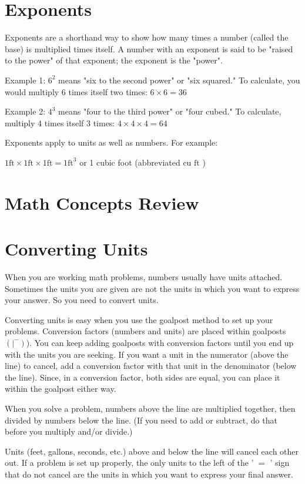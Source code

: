 \documentclass[10pt]{article}
\begin{document}
\section{Exponents}
Exponents are a shorthand way to show how many times a number (called the base) is multiplied times itself. A number with an exponent is said to be "raised to the power" of that exponent; the exponent is the "power".

Example 1: $6^{2}$ means "six to the second power" or "six squared." To calculate, you would multiply 6 times itself two times: $6 \times 6=36$

Example 2: $4^{3}$ means "four to the third power" or "four cubed." To calculate, multiply 4 times itself 3 times: $4 \times 4 \times 4=64$

Exponents apply to units as well as numbers. For example:

$1 \mathrm{ft} \times 1 \mathrm{ft} \times 1 \mathrm{ft}=1 \mathrm{ft}^{3}$ or 1 cubic foot (abbreviated cu $\mathrm{ft}$ )

\section{Math Concepts Review}
\section{Converting Units}
When you are working math problems, numbers usually have units attached. Sometimes the units you are given are not the units in which you want to express your answer. So you need to convert units.

Converting units is easy when you use the goalpost method to set up your problems. Conversion factors (numbers and units) are placed within goalposts $\left(\left.\right|^{-}\right)$). You can keep adding goalposts with conversion factors until you end up with the units you are seeking. If you want a unit in the numerator (above the line) to cancel, add a conversion factor with that unit in the denominator (below the line). Since, in a conversion factor, both sides are equal, you can place it within the goalpost either way.

When you solve a problem, numbers above the line are multiplied together, then divided by numbers below the line. (If you need to add or subtract, do that before you multiply and/or divide.)

Units (feet, gallons, seconds, etc.) above and below the line will cancel each other out. If a problem is set up properly, the only units to the left of the ' $=$ ' sign that do not cancel are the units in which you want to express your final answer.
\end{document}
